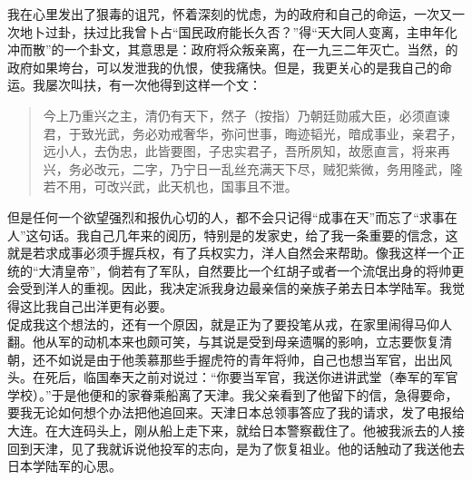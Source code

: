 我在心里发出了狠毒的诅咒，怀着深刻的忧虑，为的政府和自己的命运，一次又一次地卜过卦，扶过比我曾卜占“国民政府能长久否？”得“天大同人变离，主申年化冲而散”的一个卦文，其意思是：政府将众叛亲离，在一九三二年灭亡。当然，的政府如果垮台，可以发泄我的仇恨，使我痛快。但是，我更关心的是我自己的命运。我屡次叫扶，有一次他得到这样一个文：\\

\begin{quote}
	今上乃重兴之主，清仍有天下，然子（按指）乃朝廷勋戚大臣，必须直谏君，于致光武，务必劝戒奢华，弥问世事，晦迹韬光，暗成事业，亲君子，远小人，去伪忠，此皆要图，子忠实君子，吾所夙知，故愿直言，将来再兴，务必改元，二字，乃宁日一乱丝充满天下尽，贼犯紫微，务用隆武，隆若不用，可改兴武，此天机也，国事且不泄。\\
\end{quote}

但是任何一个欲望强烈和报仇心切的人，都不会只记得“成事在天”而忘了“求事在人”这句话。我自己几年来的阅历，特别是的发家史，给了我一条重要的信念，这就是若求成事必须手握兵权，有了兵权实力，洋人自然会来帮助。像我这样一个正统的“大清皇帝”，倘若有了军队，自然要比一个红胡子或者一个流氓出身的将帅更会受到洋人的重视。因此，我决定派我身边最亲信的亲族子弟去日本学陆军。我觉得这比我自己出洋更有必要。\\

促成我这个想法的，还有一个原因，就是正为了要投笔从戎，在家里闹得马仰人翻。他从军的动机本来也颇可笑，与其说是受到母亲遗嘱的影响，立志要恢复清朝，还不如说是由于他羡慕那些手握虎符的青年将帅，自己也想当军官，出出风头。在死后，临国奉天之前对说过：“你要当军官，我送你进讲武堂（奉军的军官学校）。”于是他便和的家眷乘船离了天津。我父亲看到了他留下的信，急得要命，要我无论如何想个办法把他追回来。天津日本总领事答应了我的请求，发了电报给大连。在大连码头上，刚从船上走下来，就给日本警察截住了。他被我派去的人接回到天津，见了我就诉说他投军的志向，是为了恢复祖业。他的话触动了我送他去日本学陆军的心思。\\

